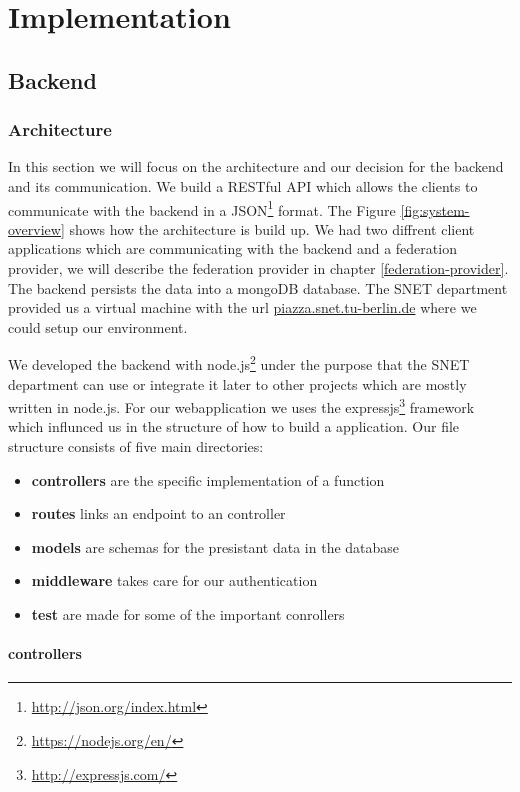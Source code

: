 \chapter{Implementation}
\label{cha:implementation}


\section{Backend}

\subsection{Architecture}

In this section we will focus on the architecture and our decision for the backend and its communication. We build a RESTful API which allows the clients to communicate with the backend in a JSON\footnote{\url{http://json.org/index.html}} format. The Figure \ref{fig:system-overview} shows how the architecture is build up. We had two diffrent client applications which are communicating with the backend and a federation provider, we will describe the federation provider in chapter \ref{federation-provider}. The backend persists the data into a mongoDB database. The SNET department provided us a virtual machine with the url \url{piazza.snet.tu-berlin.de} where we could setup our environment.

We developed the backend with node.js\footnote{\url{https://nodejs.org/en/}} under the purpose that the SNET department can use or integrate it later to other projects which are mostly written in node.js. For our webapplication we uses the expressjs\footnote{\url{http://expressjs.com/}} framework which influnced us in the structure of how to build a application. Our file structure consists of five main directories:
\begin{itemize}
  \item \textbf{controllers} are the specific implementation of a function
  \item \textbf{routes} links an endpoint to an controller
  \item \textbf{models} are schemas for the presistant data in the database
  \item \textbf{middleware} takes care for our authentication
  \item \textbf{test} are made for some of the important conrollers
\end{itemize}

\subsubsection{controllers}

